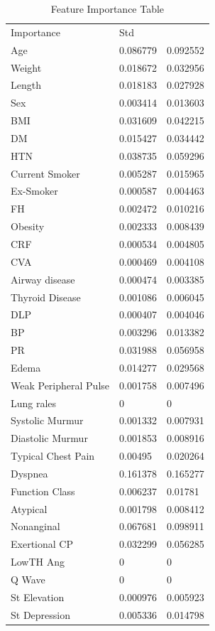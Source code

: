\documentclass[sigconf]{acmart}
\begin{document}
\begin{table}
\centering
\caption{Feature Importance Table}
\label{Importance}
\begin{tabular}{lll}
Importance            & Std      &          \\
Age                   & 0.086779 & 0.092552 \\
Weight                & 0.018672 & 0.032956 \\
Length                & 0.018183 & 0.027928 \\
Sex                   & 0.003414 & 0.013603 \\
BMI                   & 0.031609 & 0.042215 \\
DM                    & 0.015427 & 0.034442 \\
HTN                   & 0.038735 & 0.059296 \\
Current Smoker        & 0.005287 & 0.015965 \\
Ex-Smoker             & 0.000587 & 0.004463 \\
FH                    & 0.002472 & 0.010216 \\
Obesity               & 0.002333 & 0.008439 \\
CRF                   & 0.000534 & 0.004805 \\
CVA                   & 0.000469 & 0.004108 \\
Airway disease        & 0.000474 & 0.003385 \\
Thyroid Disease       & 0.001086 & 0.006045 \\
DLP                   & 0.000407 & 0.004046 \\
BP                    & 0.003296 & 0.013382 \\
PR                    & 0.031988 & 0.056958 \\
Edema                 & 0.014277 & 0.029568 \\
Weak Peripheral Pulse & 0.001758 & 0.007496 \\
Lung rales            & 0        & 0        \\
Systolic Murmur       & 0.001332 & 0.007931 \\
Diastolic Murmur      & 0.001853 & 0.008916 \\
Typical Chest Pain    & 0.00495  & 0.020264 \\
Dyspnea               & 0.161378 & 0.165277 \\
Function Class        & 0.006237 & 0.01781  \\
Atypical              & 0.001798 & 0.008412 \\
Nonanginal            & 0.067681 & 0.098911 \\
Exertional CP         & 0.032299 & 0.056285 \\
LowTH Ang             & 0        & 0        \\
Q Wave                & 0        & 0        \\
St Elevation          & 0.000976 & 0.005923 \\
St Depression         & 0.005336 & 0.014798
\end{tabular}
\end{table}
\end{document}
